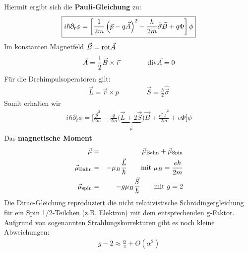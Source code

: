 Hiermit ergibt sich die {\bf Pauli-Gleichung} zu:
\begin{eqnarray*} \boxed{
i\hbar \partial_t \phi= \left[\frac 1 {2m} \left( \vec p - q \vec A\right)^2 - \frac{\hbar }{2m}\hat{\vec\sigma}\vec B + q \Phi\right ]\phi}
\end{eqnarray*}
Im konstanten Magnetfeld $\vec B = \text{rot} \vec A$
\begin{eqnarray*} \vec A = \frac 1 2\vec B \times \vec r\qquad\qquad \text{div}  \vec A = 0
\end{eqnarray*} 
Für die Drehimpulsoperatoren gilt:
\begin{eqnarray*}
\vec L = \vec r \times p \qquad \qquad \vec S = \frac \hbar 2 \hat{\vec \sigma}
\end{eqnarray*}
Somit erhalten wir
\begin{eqnarray*}
i\hbar \partial_t \phi = \Bigg[ \frac{\vec p^2}{2 m} - \frac q {2 m} \big( \underbrace{\vec L + 2\vec S}_{\vec \mu}\big) \vec B + \frac{e ^2\vec A^2}{2m} + e \Phi\Bigg]\phi
\end{eqnarray*}
Das {\bf magnetische Moment}
\begin{eqnarray*} \vec \mu &=& \vec \mu_{\text{Bahn}} + \vec \mu_{\text{Spin}}\\
\vec \mu _{\text{Bahn}} &=& - \mu_B \frac{\vec L}\hbar \qquad \text{mit }\mu_B = \frac{e \hbar}{2 m}\\
\vec \mu _{\text{spin}} &=& - g \mu_B \frac{\vec S} \hbar\qquad \text{mit }g = 2
\end{eqnarray*}
Die Dirac-Gleichung reproduziert die nicht relativistische Schrödingergleichung für ein Spin 1/2-Teilchen (z.B. Elektron) mit dem entsprechenden g-Faktor.\\
Aufgrund von sogenannten Strahlungskorrekturen gibt es noch kleine Abweichungen:
\begin{eqnarray*}
g-2 \approx \frac {\alpha} {\pi} + O(\alpha^2)
\end{eqnarray*}


